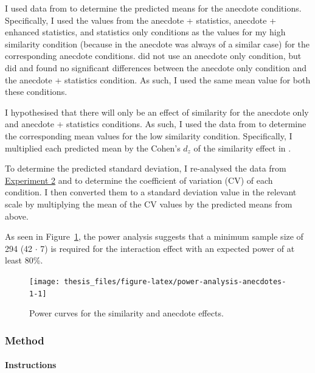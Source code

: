 \documentclass[a4paper, nobind, dvipsnames]{templates/ociamthesis}
\theoremstyle{definition}
\theoremstyle{definition}
\theoremstyle{definition}
\theoremstyle{definition}
\theoremstyle{remark}
\begin{document}
I used data from \textcite{wainberg2018} to determine the predicted means for the anecdote
conditions. Specifically, I used the values from the anecdote + statistics,
anecdote + enhanced statistics, and statistics only conditions as the values for
my high similarity condition (because in \textcite{wainberg2018} the anecdote was always
of a similar case) for the corresponding anecdote conditions. \textcite{wainberg2018} did
not use an anecdote only condition, but \textcite{wainberg2013} did and found no
significant differences between the anecdote only condition and the anecdote +
statistics condition. As such, I used the same mean value for both these
conditions.

I hypothesised that there will only be an effect of similarity for the anecdote
only and anecdote + statistics conditions. As such, I used the data from
\textcite[Study 3]{hoeken2009} to determine the corresponding mean values for the low
similarity condition. Specifically, I multiplied each predicted mean by the
Cohen's \(d_z\) of the similarity effect in \textcite[Study 3]{hoeken2009}.

To determine the predicted standard deviation, I re-analysed the data from
\textcite{jaramillo2019} \protect\hyperlink{anecdotes-2-appendix}{Experiment 2} and \textcite[Study 3]{hoeken2009} to determine the
coefficient of variation (CV) of each condition. I then converted them to a
standard deviation value in the relevant scale by multiplying the mean of the CV
values by the predicted means from above.

As seen in Figure~\ref{fig:power-analysis-anecdotes-1}, the power analysis
suggests that a minimum sample size of 294
(42 \(\cdot\) 7) is required for the interaction effect with
an expected power of at least 80\%.



\begin{figure}
\texttt{[image: thesis\_files/figure-latex/power-analysis-anecdotes-1-1]} \caption{Power curves for the similarity and anecdote effects.}\label{fig:power-analysis-anecdotes-1}
\end{figure}

\hypertarget{method-17}{%
\subsubsection{Method}\label{method-17}}

\hypertarget{instructions-materials-anecdotes-1-appendix}{%
\paragraph{Instructions}\label{instructions-materials-anecdotes-1-appendix}}
\end{document}
